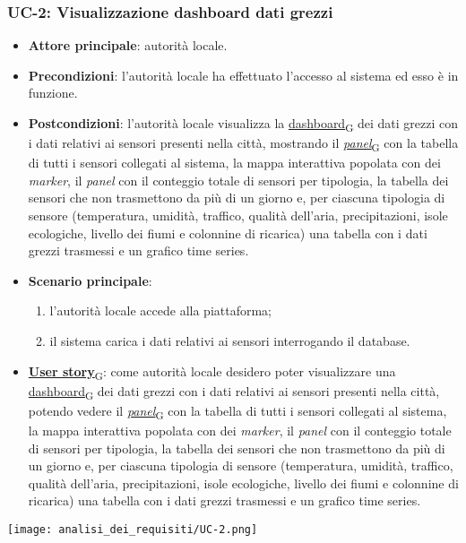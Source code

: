 \subsubsection{UC-2: Visualizzazione dashboard dati grezzi}
\begin{itemize}
	\item \textbf{Attore principale}: autorità locale.
	\item \textbf{Precondizioni}: l'autorità locale ha effettuato l'accesso al sistema ed esso è in funzione.
	\item \textbf{Postcondizioni}: l'autorità locale visualizza la \href{https://7last.github.io/docs/pb/documentazione-interna/glossario\#dashboard}{dashboard\textsubscript{G}} dei dati grezzi con i dati relativi ai sensori presenti nella città, mostrando il \href{https://7last.github.io/docs/pb/documentazione-interna/glossario\#panel}{\textit{panel}\textsubscript{G}} con la tabella di tutti i sensori collegati al sistema, la mappa interattiva popolata con dei \textit{marker}, il \textit{panel} con il conteggio totale di sensori per tipologia, la tabella dei sensori che non trasmettono da più di un giorno e, per ciascuna tipologia di sensore (temperatura, umidità, traffico, qualità dell'aria, precipitazioni, isole ecologiche, livello dei fiumi e colonnine di ricarica) una tabella con i dati grezzi trasmessi e un grafico time series.
	\item \textbf{Scenario principale}:
	      \begin{enumerate}
		      \item l'autorità locale accede alla piattaforma;
		      \item il sistema carica i dati relativi ai sensori interrogando il database.
	      \end{enumerate}
	\item \href{https://7last.github.io/docs/pb/documentazione-interna/glossario\#user-story}{\textbf{User story}\textsubscript{G}}: come autorità locale desidero poter visualizzare una \href{https://7last.github.io/docs/pb/documentazione-interna/glossario\#dashboard}{dashboard\textsubscript{G}} dei dati grezzi con i dati relativi ai sensori presenti nella città, potendo vedere il \href{https://7last.github.io/docs/pb/documentazione-interna/glossario\#panel}{\textit{panel}\textsubscript{G}} con la tabella di tutti i sensori collegati al sistema, la mappa interattiva popolata con dei \textit{marker}, il \textit{panel} con il conteggio totale di sensori per tipologia, la tabella dei sensori che non trasmettono da più di un giorno e, per ciascuna tipologia di sensore (temperatura, umidità, traffico, qualità dell'aria, precipitazioni, isole ecologiche, livello dei fiumi e colonnine di ricarica) una tabella con i dati grezzi trasmessi e un grafico time series.
\end{itemize}
\begin{center}
	\texttt{[image: analisi\_dei\_requisiti/UC-2.png]}
\end{center}

